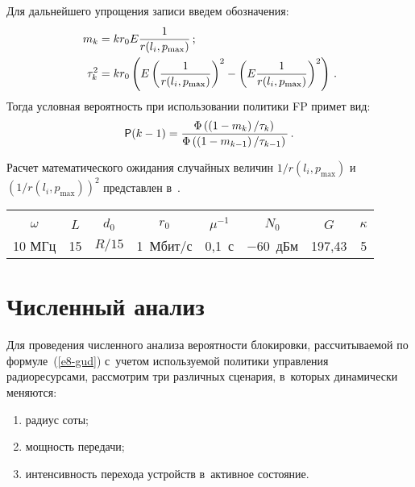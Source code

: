 \begin{multicols}{2}
  Для дальнейшего упрощения записи введем обозначения: 
 \begin{align*}
  m_k&= kr_0E \displaystyle\frac{\displaystyle 1\mathstrut}{\displaystyle r(l_i,p_{\max})\mathstrut}\,;\\
  \tau_k^2&= kr_0\left(
  E \left(\displaystyle\frac{\displaystyle 1\mathstrut}{\displaystyle r(l_i,p_{\max})\mathstrut}\right)^2 - \left( E \displaystyle\frac{\displaystyle 1\mathstrut}{\displaystyle r(l_i,p_{\max})\mathstrut}\right)^2\right)\,.
\end{align*}
 Тогда условная вероятность 
  при использовании политики FP примет вид:
  \begin{equation*}
  {\sf P}(k-1)=\displaystyle\frac{\displaystyle \Phi\left( \left(1-m_k\right)/\tau_k\right)\mathstrut}{\displaystyle 
  \Phi\left(  
\left(1-m_{k-1}\right)/\tau_{k-1}\right)\mathstrut} \,.
  \end{equation*}
  
  Расчет математического ожидания случайных величин $1/r(l_i,p_{\max})$ 
и~$(1/r(l_i,p_{\max}))^2$ представлен в~\cite{13-gud}.

\setcounter{table}{1}
\begin{table*}\small  %
\begin{center}
\vspace*{2ex}

\begin{tabular}{|c|c|c|c|c|c|c|c|}
\hline
&&&&&&&\\[-9pt]
$\omega$&$L$&$d_0$&$r_0$&$\mu^{-1}$&$N_0$&$G$&$\kappa$\\
\hline
10 МГц&15&$R/15$&1~Мбит/с&0,1~с&$-60$~дБм&197,43&5\\
\hline
\end{tabular}
\end{center}
\vspace*{-6pt}
\end{table*}
  
\section{Численный анализ}

  Для проведения численного анализа веро\-ят\-ности блокировки, 
рассчитываемой по формуле~(\ref{e8-gud}) с~учетом используемой политики 
управления радиоресурсами, рассмотрим три различных сценария, в~которых 
динамически меняются: 
\begin{enumerate}[(1)]
\item радиус соты; 
\item мощность передачи; 
\item интенсивность перехода устройств в~активное состояние. 
\end{enumerate}


\end{multicols}
